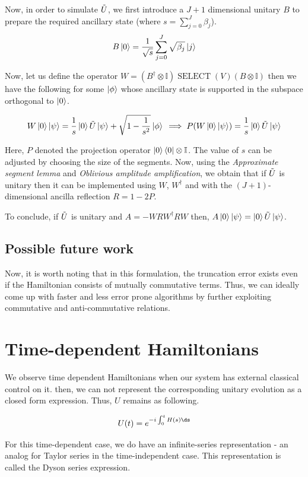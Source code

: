 \documentclass[
10pt, %
a4paper, %
oneside, %
headinclude,footinclude, %
BCOR5mm, %
]{scrartcl}
\begin{document}
Now, in order to simulate $\Tilde{U}$, we first introduce a $J + 1$ dimensional unitary $B$ to prepare the required ancillary state (where $s = \sum_{j = 0}^{J}\beta_j$).
$$B \ket{0} = \frac{1}{\sqrt s} \sum_{j = 0}^{J} \sqrt{\beta_j}\ket{j}$$

Now, let us define the operator $W = (B^{\dagger}\otimes \mathbb{I})\operatorname{SELECT}(V)(B \otimes \mathbb{I})$ then we have the following for some $\ket{\phi}$ whose ancillary state is supported in the subspace orthogonal to $\ket{0}$.

$$W\ket{0}\ket{\psi} = \frac{1}{s} \ket{0} \Tilde{U}\ket{\psi} + \sqrt{1 - \frac{1}{s^2}}\ket{\phi}\\
\implies P(W\ket{0}\ket{\psi}) = \frac{1}{s} \ket{0} \Tilde{U}\ket{\psi}$$

Here, $P$ denoted the projection operator $\ket{0}\bra{0}\otimes \mathbb{I}$. The value of $s$ can be adjusted by choosing the size of the segments. Now, using the \textit{Approximate segment lemma} and \textit{Oblivious amplitude amplification}, we obtain that if $\Tilde{U}$ is unitary then it can be implemented using $W$, $W^\dagger$ and with the $(J + 1)$-dimensional ancilla reflection $R = 1 - 2P$.\newline

To conclude, if $\Tilde{U}$ is unitary and $A = -WRW^\dagger RW$ then, $A\ket{0}\ket{\psi} = \ket{0}\Tilde{U}\ket{\psi}$.

\subsection{Possible future work}
Now, it is worth noting that in this formulation, the truncation error exists even if the Hamiltonian consists of mutually commutative terms. Thus, we can ideally come up with faster and less error prone algorithms by further exploiting commutative and anti-commutative relations.

\section{Time-dependent Hamiltonians}
We observe time dependent Hamiltonians when our system has external classical control on it. then, we can not represent the corresponding unitary evolution as a closed form expression. Thus, $U$ remains as following.

$$U(t) = e^{-i \int_0^t H(s) \ds}$$

For this time-dependent case, we do have an infinite-series representation - an analog for Taylor series in the time-independent case. This representation is called the Dyson series expression.
\end{document}
